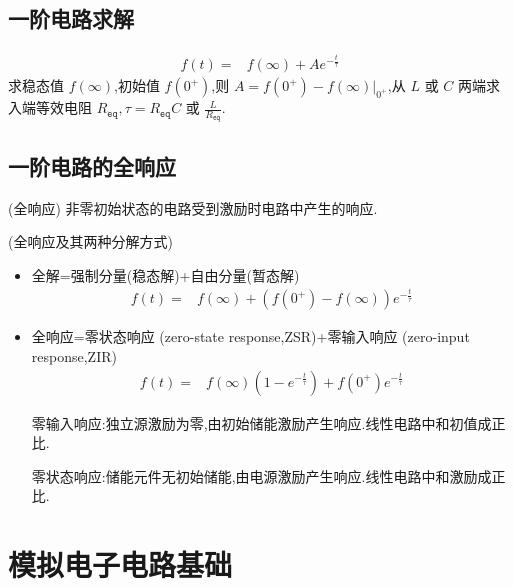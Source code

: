 
\usepackage{../../lectures_preamble}


    \subsection{一阶电路求解}
    \begin{align}
        f\left( t \right) =&f\left( \infty \right) +Ae^{-\frac{t}{\tau}}\nonumber
    \end{align}
    求稳态值 $f\left( \infty \right) $,初始值 $f\left( 0^{+} \right) $,则 $A=f\left( 0^{+} \right) -f\left( \infty \right) \big|_{0^{+}}$,从 $L$ 或 $C$ 两端求入端等效电阻 $R_{\texttt{eq}},\tau=R_{\texttt{eq}}C$ 或 $\frac{L}{R_{\texttt{eq}}}$.
    \subsection{一阶电路的全响应}
    \begin{definition}
        (全响应) 非零初始状态的电路受到激励时电路中产生的响应.
    \end{definition}
    \begin{theorem}
        (全响应及其两种分解方式) 
        \begin{itemize}
            \item 全解=强制分量(稳态解)+自由分量(暂态解)
                \begin{align}
                    f\left( t \right) =&f\left( \infty \right) +\left( f\left( 0^{+} \right) -f\left( \infty \right) \right) e^{-\frac{t}{\tau}}\nonumber
                \end{align}
            \item 全响应=零状态响应 (zero-state response,ZSR)+零输入响应 (zero-input response,ZIR)
                \begin{align}
                    f\left( t \right) =&f\left( \infty \right) \left( 1-e^{-\frac{t}{\tau}} \right)+f\left( 0^{+} \right) e^{-\frac{t}{\tau}}\nonumber
                \end{align}
                
                零输入响应:独立源激励为零,由初始储能激励产生响应.线性电路中和初值成正比.

                零状态响应:储能元件无初始储能,由电源激励产生响应.线性电路中和激励成正比.
        \end{itemize}
    \end{theorem}
    \section{模拟电子电路基础}

